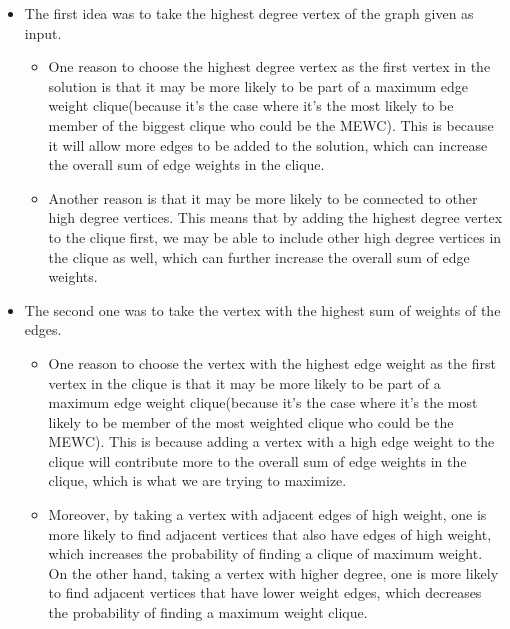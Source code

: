     \begin{itemize}
        \item The first idea was to take the highest degree vertex of the graph given as input. 
        \begin{itemize}
            \item One reason to choose the highest degree vertex as the first vertex in the solution is that it may be more likely to be part of a maximum edge weight clique(because it's the case where it's the most likely to be member of the biggest clique who could be the MEWC). This is because it will allow more edges to be added to the solution, which can increase the overall sum of edge weights in the clique.
            \item Another reason is that it may be more likely to be connected to other high degree vertices. This means that by adding the highest degree vertex to the clique first, we may be able to include other high degree vertices in the clique as well, which can further increase the overall sum of edge weights.
        \end{itemize}
        \item The second one was to take the vertex with the highest sum of weights of the edges.
        \begin{itemize}
            \item One reason to choose the vertex with the highest edge weight as the first vertex in the clique is that it may be more likely to be part of a maximum edge weight clique(because it's the case where it's the most likely to be member of the most weighted clique who could be the MEWC). This is because adding a vertex with a high edge weight to the clique will contribute more to the overall sum of edge weights in the clique, which is what we are trying to maximize.
            \item Moreover, by taking a vertex with adjacent edges of high weight, one is more likely to find adjacent vertices that also have edges of high weight, which increases the probability of finding a clique of maximum weight. On the other hand, taking a vertex with higher degree, one is more likely to find adjacent vertices that have lower weight edges, which decreases the probability of finding a maximum weight clique.
        \end{itemize}
    \end{itemize}
    
